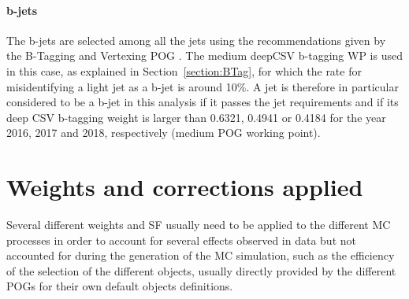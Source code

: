 \documentclass[a4paper, 10pt, openright]{report}
\begin{document}
\paragraph{b-jets}

The b-jets are selected among all the jets using the recommendations given by the B-Tagging and Vertexing \ac{POG} \cite{BTagPOG}. The medium deepCSV b-tagging \ac{WP} is used in this case, as explained in Section~\ref{section:BTag}, for which the rate for misidentifying a light jet as a b-jet is around 10\%. A jet is therefore in particular considered to be a b-jet in this analysis if it passes the jet requirements and if its deep CSV b-tagging weight is larger than 0.6321, 0.4941 or 0.4184 for the year 2016, 2017 and 2018, respectively (medium \ac{POG} working point).


\section{Weights and corrections applied} \label{subsection:Weights}

Several different weights and \ac{SF} usually need to be applied to the different \ac{MC} processes in order to account for several effects observed in data but not accounted for during the generation of the \ac{MC} simulation, such as the efficiency of the selection of the different objects, usually directly provided by the different \acfp{POG} for their own default objects definitions.
\end{document}
